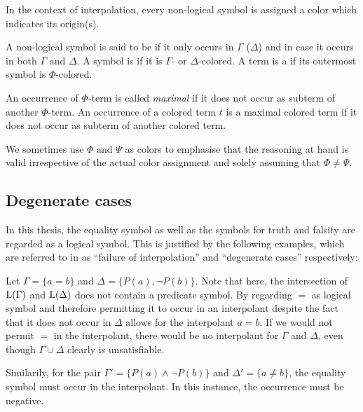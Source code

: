 In the context of interpolation, every non-logical symbol is assigned a color which indicates its origin(s). 
\begin{defi}[Coloring]
	\label{def:coloring}
A non-logical symbol is said to be  if it only occurs in $\Gamma$ ($\Delta$) and  in case it occurs in both $\Gamma$ and $\Delta$. A symbol is  if it is $\Gamma$- or $\Delta$-colored.
A term is a  if its outermost symbol is $\Phi$-colored.

An occurrence of $\Phi$-term is called \emph{maximal} if it does not occur as subterm of another $\Phi$-term.
An occurrence of a colored term $t$ is a maximal colored term if it does not occur as subterm of another colored term.
\end{defi}

We sometimes use $\Phi$ and $\Psi$ as colors to emphasise that the reasoning at hand is valid irrespective of the actual color assignment and solely assuming that $\Phi \neq \Psi$. 



\subsection{Degenerate cases}
In this thesis, the equality symbol as well as the symbols for truth and falsity are regarded as a logical symbol. 
This is justified by the following examples, which are referred to in \cite[Example 20.2 and 20.4]{boolos2007computability} as ``failure of interpolation'' and ``degenerate cases'' respectively:

\begin{exa}
	\label{exa:degenerate_equality}
	Let $\Gamma = \{ a=b \} $ and $\Delta = \{P(a), \lnot P(b)\}$.
	Note that here, the intersection of $\operatorname{L}(\Gamma)$ and $\operatorname{L}(\Delta)$ does not contain a predicate symbol.
	By regarding $=$ as logical symbol and therefore permitting it to occur in an interpolant despite the fact that it does not occur in $\Delta$ allows for the interpolant $a=b$.
	If we would not permit $=$ in the interpolant, there would be no interpolant for $\Gamma$ and $\Delta$, even though $\Gamma \cup \Delta$ clearly is unsatisfiable.

	Similarily, for the pair $\Gamma' = \{ P(a) \land \lnot P(b) \}$ and $\Delta' = \{a\neq b\}$, the equality symbol must occur in the interpolant. In this instance, the occurrence must be negative.
\end{exa}


